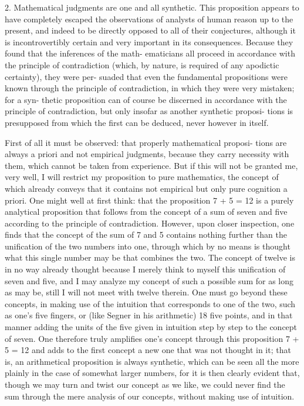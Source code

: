 2. Mathematical judgments are one and all synthetic. This proposition
appears to have completely escaped the observations of analysts of human
reason up to the present, and indeed to be directly opposed to all of their
conjectures, although it is incontrovertibly certain and very important
in its consequences. Because they found that the inferences of the math-
ematicians all proceed in accordance with the principle of contradiction
(which, by nature, is required of any apodictic certainty), they were per-
suaded that even the fundamental propositions were known through the
principle of contradiction, in which they were very mistaken; for a syn-
thetic proposition can of course be discerned in accordance with the
principle of contradiction, but only insofar as another synthetic proposi-
tions is presupposed from which the ﬁrst can be deduced, never however
in itself.

First of all it must be observed: that properly mathematical proposi-
tions are always a priori and not empirical judgments, because they carry
necessity with them, which cannot be taken from experience. But if this
will not be granted me, very well, I will restrict my proposition to pure
mathematics, the concept of which already conveys that it contains not
empirical but only pure cognition a priori.
One might well at ﬁrst think: that the proposition 7 + 5 = 12 is a
purely analytical proposition that follows from the concept of a sum
of seven and ﬁve according to the principle of contradiction. However,
upon closer inspection, one ﬁnds that the concept of the sum of 7 and
5 contains nothing further than the uniﬁcation of the two numbers into
one, through which by no means is thought what this single number may
be that combines the two. The concept of twelve is in no way already
thought because I merely think to myself this uniﬁcation of seven and
ﬁve, and I may analyze my concept of such a possible sum for as long as
may be, still I will not meet with twelve therein. One must go beyond
these concepts, in making use of the intuition that corresponds to one of
the two, such as one’s ﬁve ﬁngers, or (like Segner in his arithmetic) 18 ﬁve
points, and in that manner adding the units of the ﬁve given in intuition
step by step to the concept of seven. One therefore truly ampliﬁes one’s
concept through this proposition 7 + 5 = 12 and adds to the ﬁrst concept
a new one that was not thought in it; that is, an arithmetical proposition
is always synthetic, which can be seen all the more plainly in the case
of somewhat larger numbers, for it is then clearly evident that, though
we may turn and twist our concept as we like, we could never ﬁnd the
sum through the mere analysis of our concepts, without making use of
intuition.

